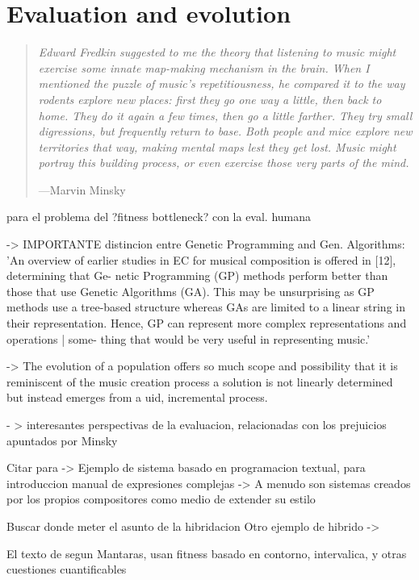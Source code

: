 \documentclass{article}
\begin{document}
\section{Evaluation and evolution}

\begin{samepage}
\begin{quotation}
\textsl{Edward Fredkin suggested to me the theory that listening to music might exercise some innate map-making mechanism in the brain. When I mentioned the puzzle of music's repetitiousness, he compared it to the way rodents explore new places: first they go one way a little, then back to home. They do it again a few times, then go a little farther. They try small digressions, but frequently return to base. Both people and mice explore new territories that way, making mental maps lest they get lost. Music might portray this building process, or even exercise those very parts of the mind.}

---Marvin Minsky \cite{Minsky1981}\end{quotation}
\end{samepage}


{\color{red}


\cite{Biles94genjam} para el problema del ?fitness bottleneck? con la eval. humana


\cite{Burton1999}  -> IMPORTANTE distincion entre Genetic Programming and Gen. Algorithms: 'An overview of earlier
studies in EC for musical composition is offered in [12], determining that Ge-
netic Programming (GP) methods perform better than those that use Genetic
Algorithms (GA). This may be unsurprising as GP methods use a tree-based
structure whereas GAs are limited to a linear string in their representation.
Hence, GP can represent more complex representations and operations | some-
thing that would be very useful in representing music.'





\cite{LimitHuman} -> The evolution of a population offers so much scope and possibility
that it is reminiscent of the music creation process a solution is not linearly
determined but instead emerges from a 
uid, incremental process.



\cite{DBLP:journals/aim/Minsky82} - > interesantes perspectivas de la
evaluacion, relacionadas con los prejuicios apuntados por Minsky

Citar \cite{BurtonHybrid} para
-> Ejemplo de sistema basado en programacion textual, para introduccion manual de expresiones complejas
	-> A menudo son sistemas creados por los propios compositores como medio de extender su estilo
	
	
Buscar donde meter el asunto de la hibridacion
Otro ejemplo de hibrido -> \cite{crawford2015algorithmic}

El texto de \cite{Papadopoulos98agenetic}
segun Mantaras, usan fitness basado en contorno, intervalica, y otras cuestiones cuantificables

}
\end{document}
